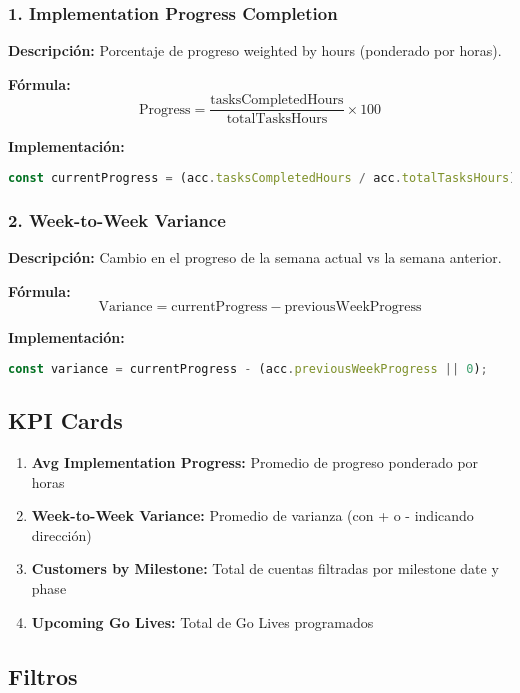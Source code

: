 \documentclass[12pt,a4paper]{article}
\begin{document}
\subsubsection{1. Implementation Progress Completion}
\textbf{Descripción:} Porcentaje de progreso weighted by hours (ponderado por horas).

\textbf{Fórmula:}
\[
\text{Progress} = \frac{\text{tasksCompletedHours}}{\text{totalTasksHours}} \times 100
\]

\textbf{Implementación:}
\begin{lstlisting}[language=JavaScript]
const currentProgress = (acc.tasksCompletedHours / acc.totalTasksHours) * 100;
\end{lstlisting}

\subsubsection{2. Week-to-Week Variance}
\textbf{Descripción:} Cambio en el progreso de la semana actual vs la semana anterior.

\textbf{Fórmula:}
\[
\text{Variance} = \text{currentProgress} - \text{previousWeekProgress}
\]

\textbf{Implementación:}
\begin{lstlisting}[language=JavaScript]
const variance = currentProgress - (acc.previousWeekProgress || 0);
\end{lstlisting}

\subsection{KPI Cards}

\begin{enumerate}
    \item \textbf{Avg Implementation Progress:} Promedio de progreso ponderado por horas
    \item \textbf{Week-to-Week Variance:} Promedio de varianza (con + o - indicando dirección)
    \item \textbf{Customers by Milestone:} Total de cuentas filtradas por milestone date y phase
    \item \textbf{Upcoming Go Lives:} Total de Go Lives programados
\end{enumerate}

\subsection{Filtros}
\end{document}
